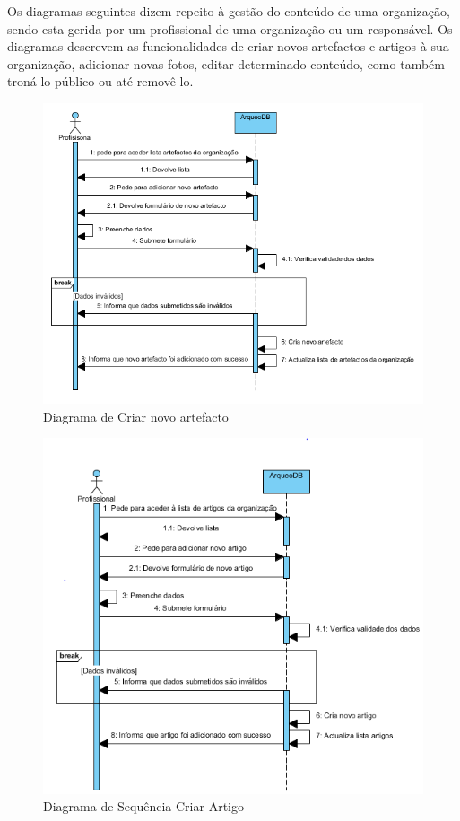 ﻿\documentclass[12pt,a4paper]{article}
\begin{document}
\clearpage
Os diagramas seguintes dizem repeito à gestão do conteúdo de uma organização, sendo esta gerida por um profissional de uma organização ou um responsável. Os diagramas descrevem as funcionalidades de criar novos artefactos e artigos à sua organização, adicionar novas fotos, editar determinado conteúdo, como também troná-lo público ou até removê-lo.\\

\begin{figure}[h!]
\centering
\includegraphics[scale=1]{sequencia/criarartefacto}
\caption{Diagrama de Criar novo artefacto} 
\end{figure}


\begin{figure}[h!]
\centering
\includegraphics[scale=0.8]{sequencia/criarartigo}
\caption{Diagrama de Sequência Criar Artigo} 
\end{figure}
\end{document}
